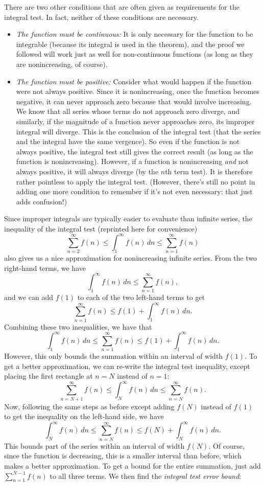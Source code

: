 \documentclass{myarticle}
\theoremstyle{nospace}
\newtheorem{old series theorem}{Theorem}
\newenvironment{series theorem}{\begin{mdframed}\begin{old series theorem}}{\end{old series theorem}\end{mdframed}}
\begin{document}
There are two other conditions that are often given as requirements for the integral test. In fact, neither of these conditions are necessary.
\begin{itemize}
\item \emph{The function must be continuous:} It is only necessary for the function to be integrable (because its integral is used in the theorem), and the proof we followed will work just as well for non-continuous functions (as long as they are nonincreasing, of course).
\item \emph{The function must be positive:} Consider what would happen if the function were not always positive. Since it is nonincreasing, once the function becomes negative, it can never approach zero because that would involve increasing. We know that all series whose terms do not approach zero diverge, and similarly, if the magnitude of a function never approaches zero, its improper integral will diverge. This is the conclusion of the integral test (that the series and the integral have the same vergence). So even if the function is not always positive, the integral test still gives the correct result (as long as the function is nonincreasing). However, if a function is nonincreasing \emph{and} not always positive, it will always diverge (by the $n$th term test). It is therefore rather pointless to apply the integral test. (However, there's still no point in adding one more condition to remember if it's not even necessary: that just adds confusion!)
\end{itemize}

Since improper integrals are typically easier to evaluate than infinite series, the inequality of the integral test (reprinted here for convenience) \[ \sum_{n=2}^\infty f(n) \leq \int_1^\infty f(n) \,dn \leq \sum_{n=1}^\infty f(n) \] also gives us a nice approximation for nonincreasing infinite series. From the two right-hand terms, we have \[ \int_1^\infty f(n) \,dn \leq \sum_{n=1}^\infty f(n), \] and we can add $f(1)$ to each of the two left-hand terms to get \[ \sum_{n=1}^\infty f(n) \leq f(1) + \int_1^\infty f(n) \,dn. \] Combining these two inequalities, we have that \[ \int_1^\infty f(n) \,dn \leq \sum_{n=1}^\infty f(n) \leq f(1) + \int_1^\infty f(n) \,dn. \] However, this only bounds the summation within an interval of width $f(1)$. To get a better approximation, we can re-write the integral test inequality, except placing the first rectangle at $n = N$ instead of $n = 1$: \[ \sum_{n=N+1}^\infty f(n) \leq \int_N^\infty f(n) \,dn \leq \sum_{n=N}^\infty f(n). \] Now, following the same steps as before except adding $f(N)$ instead of $f(1)$ to get the inequality on the left-hand side, we have \[ \int_N^\infty f(n) \,dn \leq \sum_{n=N}^\infty f(n) \leq f(N) + \int_N^\infty f(n) \,dn. \] This bounds part of the series within an interval of width $f(N)$. Of course, since the function is decreasing, this is a smaller interval than before, which makes a better approximation. To get a bound for the entire summation, just add $\sum_{n=1}^{N-1} f(n)$ to all three terms. We then find the \emph{integral test error bound}:
\end{document}
